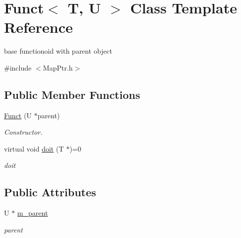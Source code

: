 \hypertarget{classFunct}{
\section{Funct$<$ T, U $>$ Class Template Reference}
\label{classFunct}
}


base functionoid with parent object  


{\ttfamily \#include $<$MapPtr.h$>$}\subsection*{Public Member Functions}
\begin{DoxyCompactItemize}
\item 
\hypertarget{classFunct_a762227b83a3d6203be2e81abd169cbc1}{
\hyperlink{classFunct_a762227b83a3d6203be2e81abd169cbc1}{Funct} (U $\ast$parent)}
\label{classFunct_a762227b83a3d6203be2e81abd169cbc1}

\begin{DoxyCompactList}\small\item\em Constructor. \item\end{DoxyCompactList}\item 
\hypertarget{classFunct_aa8e3830346161b9cce685235852b63ec}{
virtual void \hyperlink{classFunct_aa8e3830346161b9cce685235852b63ec}{doit} (T $\ast$)=0}
\label{classFunct_aa8e3830346161b9cce685235852b63ec}

\begin{DoxyCompactList}\small\item\em doit \item\end{DoxyCompactList}\end{DoxyCompactItemize}
\subsection*{Public Attributes}
\begin{DoxyCompactItemize}
\item 
\hypertarget{classFunct_ae71f483c618d664ae64aaab433440ee9}{
U $\ast$ \hyperlink{classFunct_ae71f483c618d664ae64aaab433440ee9}{m\_\-parent}}
\label{classFunct_ae71f483c618d664ae64aaab433440ee9}

\begin{DoxyCompactList}\small\item\em parent \item\end{DoxyCompactList}\end{DoxyCompactItemize}


